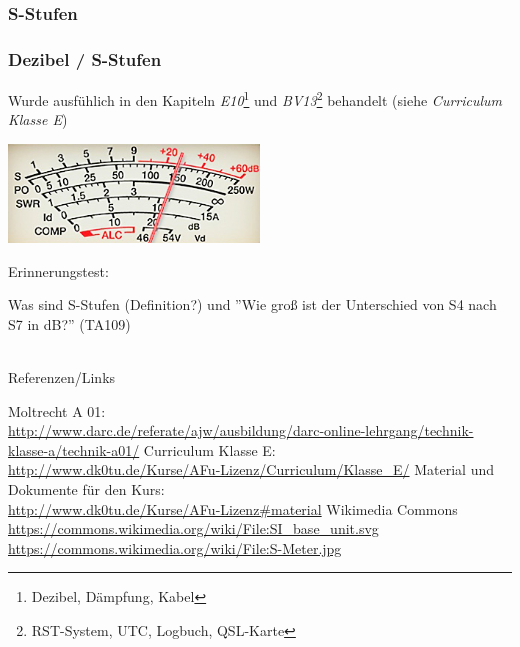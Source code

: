 \subsubsection{S-Stufen}

\begin{frame}
    \frametitle{Dezibel / S-Stufen}

    Wurde ausfühlich in den Kapiteln \emph{E10}\footnote{Dezibel, Dämpfung,
    Kabel} und \emph{BV13}\footnote{RST-System, UTC, Logbuch, QSL-Karte}
    behandelt (siehe \emph{Curriculum Klasse E}\hyperlink{refs}{\cite{curr}})

    \begin{center}
        \includegraphics[width=0.5\textwidth]{e10/S-Meter.jpg}
        \tiny \hyperlink{refs}{\cite{wc}}
    \end{center}

    Erinnerungstest:

    \begin{block}{Was sind S-Stufen (Definition?) und ''Wie groß ist der
                  Unterschied von S4 nach S7 in dB?'' (TA109)}
    \end{block}

\end{frame}

\renewcommand{\refname}{Referenzen}

\hypertarget{refs}{}
\textcolor{white}{} \\ %
\Large Referenzen/Links
\footnotesize

\begin{thebibliography}{}
     Moltrecht A 01: \\
                    \url{http://www.darc.de/referate/ajw/ausbildung/darc-online-lehrgang/technik-klasse-a/technik-a01/}
      Curriculum Klasse E: \\
                    \url{http://www.dk0tu.de/Kurse/AFu-Lizenz/Curriculum/Klasse_E/}
       Material und Dokumente für den Kurs: \\
                    \url{http://www.dk0tu.de/Kurse/AFu-Lizenz#material}
        Wikimedia Commons \\
                    \url{https://commons.wikimedia.org/wiki/File:SI_base_unit.svg}\\
                    \url{https://commons.wikimedia.org/wiki/File:S-Meter.jpg}
\end{thebibliography} 


